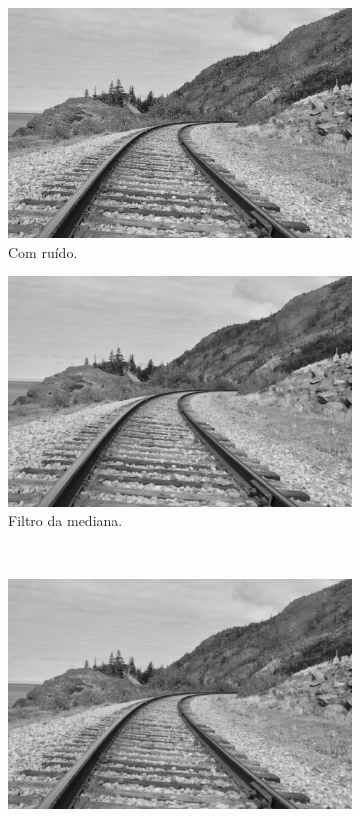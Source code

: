 \documentclass[10pt,a4paper]{article}
\begin{document}
\begin{figure}[!ht]
    \centering
    \begin{subfigure}[ht]{0.45\textwidth}
        \includegraphics[width=\textwidth]{sp.jpg}
        \caption{Com ruído.}
    \end{subfigure}
    \qquad
    \begin{subfigure}[ht]{0.45\textwidth}
        \includegraphics[width=\textwidth]{sp_median.jpg}
        \caption{Filtro da mediana.}
    \end{subfigure}
    \\
    \begin{subfigure}[ht]{0.45\textwidth}
        \includegraphics[width=\textwidth]{sp_gaussian.jpg}

\end{subfigure}
\end{figure}
\end{document}
